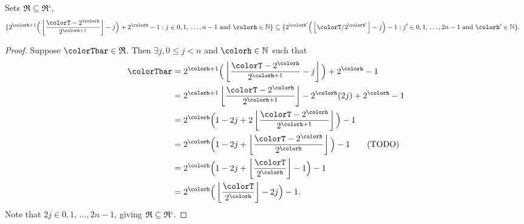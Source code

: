 \begin{sublemma}
\label{thm:tilted-rsubset}
Sets $\mathfrak{R} \subseteq \mathfrak{R}`$,
\begin{align*}
\{
  2^{\colorh + 1}\Big( \left\lfloor\frac{\colorT - 2^{\colorh}}{2^{\colorh + 1}} \right\rfloor - j\Big) + 2^{\colorh} - 1
  :
  j \in 0,1,\,\ldots,n-1
  \text{ and }
  \colorh \in \mathbb{N}
\}
&\subseteq
\{
  2^{\colorh'}\Big(\left\lfloor \colorT / 2^{\colorh'} \right\rfloor - j\Big) - 1
  :
  j' \in 0,1,\,\ldots,2n-1
  \text{ and }
  \colorh' \in \mathbb{N}
\}.
\end{align*}
\end{sublemma}
\begin{proof}
Suppose $\colorTbar \in \mathfrak{R}$.
Then $\exists j,  0 \leq j < n$ and $\colorh \in \mathbb{N}$ such that
\begin{align*}
\colorTbar
&= 2^{\colorh + 1}\Big(\left\lfloor \frac{\colorT - 2^{\colorh}}{2^{\colorh + 1}} - j\right\rfloor\Big) + 2^{\colorh} - 1\\
&= 2^{\colorh + 1}\left\lfloor \frac{\colorT - 2^{\colorh}}{2^{\colorh + 1}}\right\rfloor - 2^{\colorh}(2j) + 2^{\colorh} - 1\\
&= 2^{\colorh} \Big( 1 - 2j + 2\left\lfloor \frac{\colorT - 2^{\colorh}}{2^{\colorh + 1}} \right\rfloor \Big) - 1\\
&= 2^{\colorh} \Big( 1 - 2j + \left\lfloor \frac{\colorT - 2^{\colorh}}{2^{\colorh}} \right\rfloor \Big) - 1 \tag{TODO}\\
&= 2^{\colorh} \Big( 1 - 2j + \left\lfloor \frac{\colorT}{2^{\colorh}} \right\rfloor - 1 \Big) - 1\\
&= 2^{\colorh} \Big(\left\lfloor \frac{\colorT}{2^{\colorh}}\right\rfloor - 2j \Big) - 1.
\end{align*}
Note that $2j \in 0,1,\,\ldots,2n-1$, giving $\mathfrak{R} \subseteq \mathfrak{R}`$.
\end{proof}

